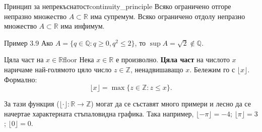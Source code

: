 \begin{theorem}{Принцип за непрекъснатост}{continuity_principle}
Всяко ограничено отгоре непразно множество $A \subset \mathbb{R}$ има супремум. Всяко ограничено отдолу непразно множество $A \subset \mathbb{R}$ има инфимум.
\end{theorem}

\begin{problembox}{Пример 3.9}
Ако $A = \{ q \in \mathbb{Q} : q \ge 0, q^2 \le 2 \}$, то $\sup A = \sqrt{2} \notin \mathbb{Q}$.
\end{problembox}

\begin{definition}{Цяла част на $x \in \mathbb{R}$}{floor}
Нека $x \in \mathbb{R}$ е произволно. \textbf{Цяла част} на числото $x$ наричаме най-голямото цяло число $z \in \mathbb{Z}$, ненадвишаващо $x$. Бележим го с $\lfloor x \rfloor$. Формално:
\[
\lfloor x \rfloor = \max \{z \in \mathbb{Z} : z \le x\}.
\]
\end{definition}

За тази функция ($\lfloor \cdot \rfloor : \mathbb{R} \to \mathbb{Z}$) могат да се съставят много примери и лесно да се начертае характерната стъпаловидна графика. Така например, $\lfloor -\pi \rfloor = -4$; $\lfloor \pi \rfloor = 3$; $\lfloor 0 \rfloor = 0$.


